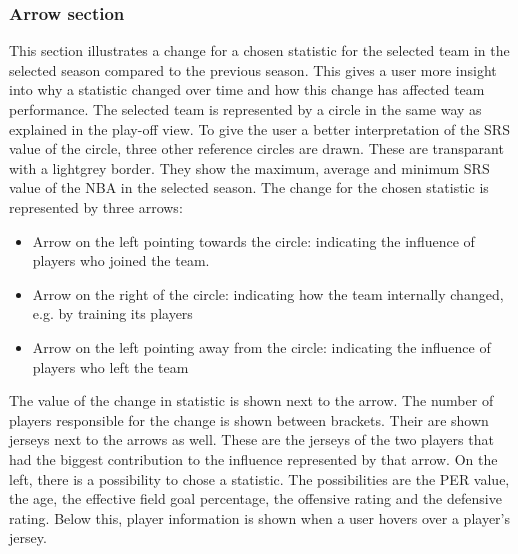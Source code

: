 \documentclass[chi_draft]{sigchi}
\begin{document}
\subsubsection{Arrow section}
This section illustrates a change for a chosen statistic for the selected team in 
the selected season compared to the previous season. This gives a user more 
insight into why a statistic changed over time and how this change has affected 
team performance. The selected team is represented by a circle in the same way as 
explained in the play-off view. To give the user a better interpretation of the SRS 
value of the circle, three other reference circles are drawn. These are 
transparant with a lightgrey border. They show the maximum, average and minimum SRS 
value of the NBA in the selected season. The change for the chosen statistic is 
represented by three arrows:
\begin{itemize}
    \item Arrow on the left pointing towards the circle: indicating the
        influence of players who joined the team.
    \item Arrow on the right of the circle: indicating how the team internally
        changed, e.g. by training its players
    \item Arrow on the left pointing away from the circle: indicating the
        influence of players who left the team 
\end{itemize}
The value of the change in statistic is shown next to the arrow. The number of 
players responsible for the change is shown between brackets. Their are shown 
jerseys next to the arrows as well. These are the jerseys of the two players that 
had the biggest contribution to the influence represented by that arrow.  
On the left, there is a possibility to chose a statistic. The possibilities 
are the PER value, the age, the effective field goal percentage, the offensive rating 
and the defensive rating. Below this, player information is shown when a user hovers
over a player's jersey. 
\end{document}
